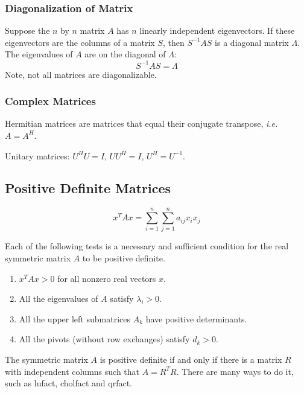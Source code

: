  \subsubsection{Diagonalization of Matrix}

 Suppose the $n$ by $n$ matrix $A$ has $n$ linearly independent eigenvectors.
 If these eigenvectors are the columns of a matrix $S$, then $S^{-1}AS$ is a
 diagonal matrix $\Lambda$. The eigenvalues of $A$ are on the diagonal of
 $\Lambda$:
 $$S^{-1}AS = \Lambda$$
 Note, not all matrices are diagonalizable.

 \subsubsection{Complex Matrices}

 Hermitian matrices are matrices that equal their conjugate transpose,
 {\it i.e.} $A = A^H$.

 Unitary matrices: $U^HU=I$, $UU^H=I$, $U^H=U^{-1}$.

%
%
%

\subsection{Positive Definite Matrices}

 $$x^TAx = \sum_{i=1}^n \sum_{j=1}^n a_{ij}x_ix_j$$

 Each of the following tests is a necessary and sufficient
 condition for the real symmetric matrix $A$ to be positive
 definite.
 \begin{enumerate}
 \item $x^TAx>0$ for all nonzero real vectors $x$.
 \item All the eigenvalues of $A$ satisfy $\lambda_i>0$.
 \item All the upper left submatrices $A_k$ have positive
	 determinants.
 \item All the pivots (without row exchanges) satisfy $d_k>0$.
 \end{enumerate}
 The symmetric matrix $A$ is positive definite if and only if
 there is a matrix $R$ with independent columns such that
 $A=R^TR$. There are many ways to do it, such as lufact,
 cholfact and qrfact.

